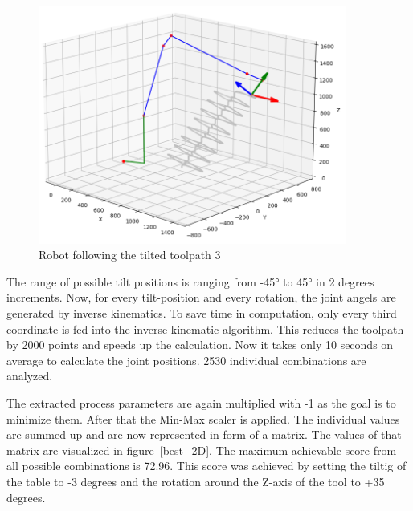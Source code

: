 \begin{figure}[H]
	\centerline{\includegraphics[width=0.9\textwidth]{figures/robotANDpath3_45.png}}
	\caption{Robot following the tilted toolpath 3}
	\label{TP3_25_robot}
\end{figure}

The range of possible tilt positions is ranging from -45° to 45° in 2 degrees increments. 
Now, for every tilt-position and every rotation, the joint angels are generated by inverse kinematics. To save time in computation, only every third coordinate is fed into the inverse kinematic algorithm. This reduces the toolpath by 2000 points and speeds up the calculation. Now it takes only 10 seconds on average to calculate the joint positions. 2530 individual combinations are analyzed.

The extracted process parameters are again multiplied with -1 as the goal is to minimize them. After that the Min-Max scaler is applied. The individual values are summed up and are now represented in form of a matrix. The values of that matrix are visualized in figure~\ref{best_2D}. The maximum achievable score from all possible combinations is 72.96. This score was achieved by setting the tiltig of the table to -3 degrees and the rotation around the Z-axis of the tool to +35 degrees.



